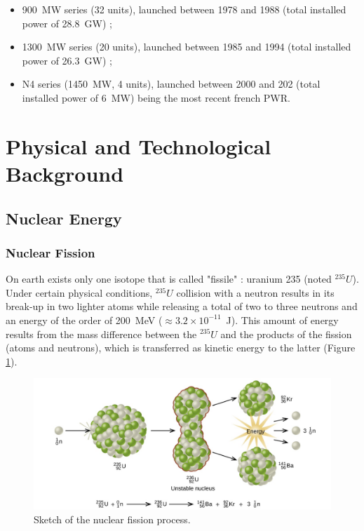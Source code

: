 \begin{itemize}
\item 900~MW series (32 units), launched between 1978 and 1988 (total installed power of 28.8~GW) ;
\item 1300~MW series (20 units), launched between 1985 and 1994 (total installed power of 26.3~GW) ;
\item N4 series (1450~MW, 4 units), launched between 2000 and 202 (total installed power of 6~MW) being the most recent french PWR.
\end{itemize}





\section{Physical and Technological Background}

\subsection{Nuclear Energy}

\subsubsection{Nuclear Fission}

On earth exists only one isotope that is called "fissile" : uranium 235 (noted $^{235}U$). Under certain physical conditions, $^{235}U$ collision with a neutron results in its break-up in two lighter atoms while releasing a total of two to three neutrons and an energy of the order of 200~MeV ($\approx 3.2 \times 10^{-11}$\ J). This amount of energy results from the mass difference between the $^{235}U$ and the products of the fission (atoms and neutrons), which is transferred as kinetic energy to the latter (Figure \ref{fig:fission}).



\begin{figure}[!h]
\centering
\includegraphics[width=0.7\linewidth]{img/intro/fission.jpg}
\caption{Sketch of the nuclear fission process. \cite{chem_libretext}}
\label{fig:fission}
\end{figure}

